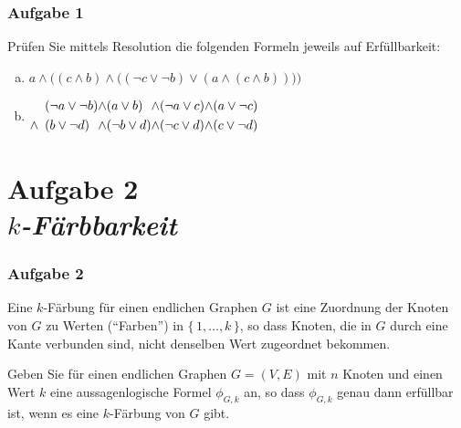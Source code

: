 \documentclass{beamer}
\begin{document}
	\begin{frame} \frametitle{Aufgabe 1}
		Prüfen Sie mittels Resolution die folgenden Formeln jeweils auf Erfüllbarkeit:
		\begin{enumerate}[a)]
			\item $a \land \Big(  (c \land b) \land \big( (\lnot c \lor \lnot b) \lor (a \land (c \land b)) \big) \Big)$
			\item $\begin{alignedat}{5}
				&(\lnot a \lor \lnot b) &\land& (a \lor b) &\land& (\lnot a \lor c) &\land& (a \lor \lnot c) \\ 
				\land \enskip &(b \lor \lnot d) &\land& (\lnot b \lor d) &\land& (\lnot c \lor d) &\land& (c \lor \lnot d)
				\end{alignedat}$
		\end{enumerate}
	\end{frame}

	\section{Aufgabe 2 \\ \itshape $k$-Färbbarkeit}
	
	\begin{frame} \frametitle{Aufgabe 2}
		\justifying
		Eine $k$-Färbung für einen endlichen Graphen $G$ ist eine Zuordnung der Knoten von $G$ zu Werten (\enquote{Farben}) in $\{\,1, \dots, k\,\}$, so dass Knoten, die in $G$ durch eine Kante verbunden sind, nicht denselben Wert zugeordnet bekommen.
		
		Geben Sie für einen endlichen Graphen $G = (V,E)$ mit $n$ Knoten und einen Wert $k$ eine aussagenlogische Formel $\phi_{G,k}$ an, so dass $\phi_{G,k}$ genau dann erfüllbar ist, wenn es eine $k$-Färbung von $G$ gibt.
	\end{frame}
\end{document}
